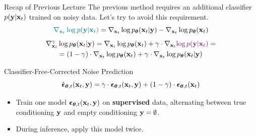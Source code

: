 \documentclass{beamer}
\begin{document}
\begin{frame}{Recap of Previous Lecture}
	The previous method requires an additional classifier $p(\mathbf{y} | \mathbf{x}_t)$ trained on noisy data. Let's try to avoid this requirement.
	\[
		{\color{teal}\nabla_{\mathbf{x}_t} \log p(\mathbf{y} | \mathbf{x}_t)} =  \nabla_{\mathbf{x}_t} \log p_{\boldsymbol{\theta}}(\mathbf{x}_t| \mathbf{y}) -\nabla_{\mathbf{x}_t} \log  p_{\boldsymbol{\theta}}(\mathbf{x}_t)
	\]
	\vspace{-0.4cm}
	\begin{multline*}
		\nabla_{\mathbf{x}_t}^{\gamma} \log p_{\boldsymbol{\theta}}(\mathbf{x}_t | \mathbf{y}) = \nabla_{\mathbf{x}_t} \log p_{\boldsymbol{\theta}}(\mathbf{x}_t) + \gamma \cdot \nabla_{\mathbf{x}_t} {\color{violet}\log p(\mathbf{y} | \mathbf{x}_t)} = \\
		=  (1 - \gamma) \cdot  \nabla_{\mathbf{x}_t} \log p_{\boldsymbol{\theta}}(\mathbf{x}_t) + \gamma \cdot  \nabla_{\mathbf{x}_t} \log p_{\boldsymbol{\theta}}(\mathbf{x}_t| \mathbf{y})
	\end{multline*}
	\vspace{-0.4cm}
	\begin{block}{Classifier-Free-Corrected Noise Prediction}
		\vspace{-0.3cm}
		\[
			\hat{\boldsymbol{\epsilon}}_{\boldsymbol{\theta}, t}(\mathbf{x}_t, \mathbf{y}) = \gamma \cdot \boldsymbol{\epsilon}_{\boldsymbol{\theta}, t}(\mathbf{x}_t, \mathbf{y}) + (1 - \gamma) \cdot \boldsymbol{\epsilon}_{\boldsymbol{\theta}, t}(\mathbf{x}_t)
		\]
		\vspace{-0.5cm}
	\end{block}
	\begin{itemize}
		\item Train one model $\boldsymbol{\epsilon}_{\boldsymbol{\theta}, t}(\mathbf{x}_t, \mathbf{y})$ on \textbf{supervised} data, alternating between true conditioning $\mathbf{y}$ and empty conditioning $\mathbf{y} = \emptyset$.
		\item During inference, apply this model twice.
	\end{itemize}
	
\end{frame}
\end{document}
